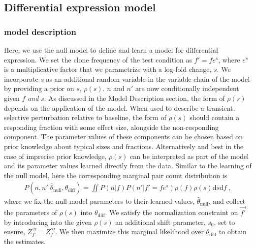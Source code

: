\documentclass[letterpaper,english,prl,reprint,longbibliography]{revtex4-1} %
\begin{document}
\subsection*{Differential expression model}

\subsubsection*{model description}
Here, we use the null model to define and learn a model for differential expression. 
We set the clone frequency of the test condition as $f'=fe^s$, where $e^s$ is a multiplicative factor that we parametrize with a log-fold change, $s$. 
We incorporate $s$ as an additional random variable in the variable chain of the model by providing a prior on $s$, $\rho(s)$. 
$n$ and $n'$ are now conditionally independent given $f$ \textit{and} $s$.
As discussed in the Model Description section, the form of $\rho(s)$ depends on the application of the model. 
When used to describe a transient, selective perturbation relative to baseline, the form of $\rho(s)$ should contain a responding fraction with some effect size, alongside the non-responding component. 
The parameter values of these components can be chosen based on prior knowledge about typical sizes and fractions. 
Alternatively and best in the case of imprecise prior knowledge, $\rho(s)$ can be interpreted as part of the model and its parameter values learned directly from the data. 
Similar to the learning of the null model, here the corresponding marginal pair count distribution is 
\begin{equation}
    \begin{split}
	P(n,n'|\hat{\theta}_{\textrm{null}},\theta_{\textrm{diff}})=\iint P(n|f)P(n'|f'=fe^s)\rho(f)\rho(s)\text{d}s\text{d}f\;,
	\end{split}
\end{equation}
where we fix the null model parameters to their learned values, $\hat{\theta}_{\textrm{null}}$, and collect the parameters of $\rho(s)$ into $\theta_{\textrm{diff}}$. 
We satisfy the normalization constraint on $\vec{f'}$ by introducing into the given $\rho(s)$ an additional shift parameter, $s_0$, set to ensure, $Z^\mathcal{D}_{f'}=Z^\mathcal{D}_f$.
We then maximize this marginal likelihood over $\theta_{\textrm{diff}}$ to obtain the estimates. 
\end{document}

